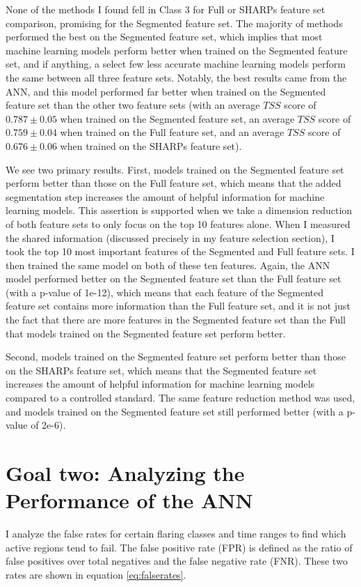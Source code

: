\documentclass[defaultstyle,11pt]{thesis}
\begin{document}
None of the methods I found fell in Class 3 for Full or SHARPs feature set comparison, promising for the Segmented feature set. The majority of methods performed the best on the Segmented feature set, which implies that most machine learning models perform better when trained on the Segmented feature set, and if anything, a select few less accurate machine learning models perform the same between all three feature sets. Notably, the best results came from the ANN, and this model performed far better when trained on the Segmented feature set than the other two feature sets (with an average $TSS$ score of $0.787 \pm 0.05$ when trained on the Segmented feature set, an average $TSS$ score of $0.759 \pm 0.04$ when trained on the Full feature set, and an average $TSS$ score of $0.676 \pm 0.06$ when trained on the SHARPs feature set). 

We see two primary results. First, models trained on the Segmented feature set perform better than those on the Full feature set, which means that the added segmentation step increases the amount of helpful information for machine learning models. This assertion is supported when we take a dimension reduction of both feature sets to only focus on the top 10 features alone. When I measured the shared information (discussed precisely in my feature selection section), I took the top 10 most important features of the Segmented and Full feature sets. I then trained the same model on both of these ten features. Again, the ANN model performed better on the Segmented feature set than the Full feature set (with a p-value of 1e-12), which means that each feature of the Segmented feature set contains more information than the Full feature set, and it is not just the fact that there are more features in the Segmented feature set than the Full that models trained on the Segmented feature set perform better.

Second, models trained on the Segmented feature set perform better than those on the SHARPs feature set, which means that the Segmented feature set increases the amount of helpful information for machine learning models compared to a controlled standard. The same feature reduction method was used, and models trained on the Segmented feature set still performed better (with a p-value of 2e-6).  

\section{Goal two: Analyzing the Performance of the ANN}
I analyze the false rates for certain flaring classes and time ranges to find which active regions tend to fail. The false positive rate (FPR) is defined as the ratio of false positives over total negatives and the false negative rate (FNR). These two rates are shown in equation \ref{eq:falserates}.
\end{document}
